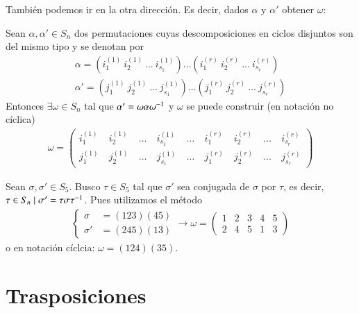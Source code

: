 También podemos ir en la otra dirección. Es decir, dados $\alpha$ y $\alpha'$ obtener $\omega$:

\begin{pro}
	Sean $\alpha, \alpha' \in S_n$ dos permutaciones cuyas descomposiciones en ciclos disjuntos son del mismo tipo y se denotan por
	\begin{align*}
	\alpha = \left(i_1^{(1)}\ i_2^{(1)}\ \dots\ i_{s_1}^{(1)}\right)\dots\left(i_1^{(r)}\ i_2^{(r)}\ \dots\ i_{s_r}^{(r)}\right) \\
	\alpha' = \left(j_1^{(1)}\ j_2^{(1)}\ \dots\ j_{s_1}^{(1)}\right)\dots\left(j_1^{(r)}\ j_2^{(r)}\ \dots\ j_{s_r}^{(r)}\right)
	\end{align*}
	Entonces $\exists \omega \in S_n$ tal que $\alpha' = \omega \alpha \omega^{-1}$ y $\omega$ se puede construir (en notación no cíclica)
	\begin{align*}
	\omega = \left(\begin{array}{ccccccccc}
	i_1^{(1)}\ &i_2^{(1)}\ &\dots\ &i_{s_1}^{(1)}\ & \dots\ &i_1^{(r)}\ &i_2^{(r)}\ &\dots\ &i_{s_r}^{(r)} \\
	j_1^{(1)}\ &j_2^{(1)}\ &\dots\ &j_{s_1}^{(1)}\ & \dots\ &j_1^{(r)}\ &j_2^{(r)}\ &\dots\ &j_{s_r}^{(r)}
	\end{array}\right)
	\end{align*}
\end{pro}

\begin{ej}
	Sean $\sigma, \sigma' \in S_5$. Busco $\tau \in S_5$ tal que $\sigma'$ sea conjugada de $\sigma$ por $\tau$, es decir, $\tau \in S_n \mid \sigma' = \tau\sigma\tau^{-1}$. Pues utilizamos el método
	\begin{align*}
	\begin{cases}
	\sigma 	&= (123)(45) \\
	\sigma' &= (245)(13)
	\end{cases} \longrightarrow \omega = \left(\begin{array}{ccccc}
	1 & 2 & 3 & 4 & 5 \\
	2 & 4 & 5 & 1 & 3
	\end{array}\right)
	\end{align*}
	o en notación cíclcia: $\omega = (124)(35)$.
\end{ej}

\section{Trasposiciones}

